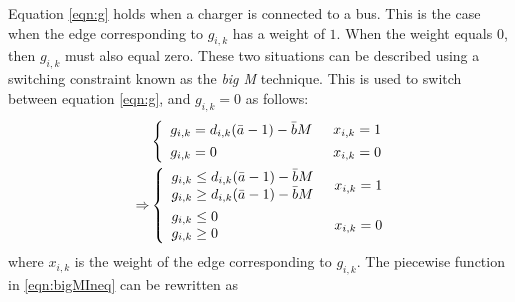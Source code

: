 Equation \ref{eqn:g} holds when a charger is connected to a bus.  This is the case when the edge corresponding to $g_{i,k}$ has a weight of $1$. When the weight equals $0$, then $g_{i,k}$ must also equal zero. These two situations can be described using a switching constraint known as the \textit{big M} technique. This is used to switch between equation \ref{eqn:g}, and $g_{i,k} = 0$ as follows: 
\begin{equation}\label{eqn:bigMIneq}
\begin{aligned}
	& \begin{dcases} 
		\begin{array}{l}
		g_{i,k} = d_{i,k}(\bar{a} - 1) - \bar{b}M
		\end{array} & x_{i,k} = 1\\
		\begin{array}{l}
		g_{i,k} = 0
		\end{array} & x_{i,k} = 0\\
	\end{dcases} \\ 
	\Rightarrow & 
	\begin{dcases} 
		\begin{array}{l}
		g_{i,k} \le d_{i,k}(\bar{a} - 1) - \bar{b}M\\
		g_{i,k} \ge d_{i,k}(\bar{a} - 1) - \bar{b}M\\
		\end{array}
		& x_{i,k} = 1 \\
		\begin{array}{l}
		g_{i,k} \le 0 \\
		g_{i,k} \ge 0 \\
		\end{array} & x_{i,k} = 0\\
    	\end{dcases} 
\end{aligned}
\end{equation}
where $x_{i,k}$ is the weight of the edge corresponding to $g_{i,k}$.  The piecewise function in \ref{eqn:bigMIneq} can be rewritten as 
